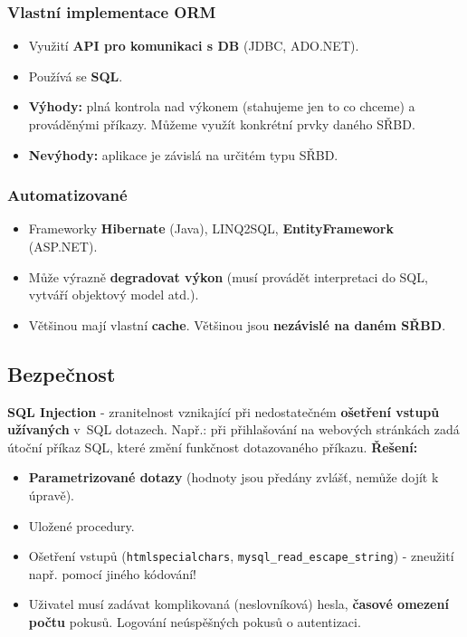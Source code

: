\subsubsection{Vlastní implementace ORM}
\begin{itemize}
\item Využití \textbf{API pro komunikaci s DB} (JDBC, ADO.NET).
\item Používá se \textbf{SQL}.
\item \textbf{Výhody:} plná kontrola nad výkonem (stahujeme jen to co chceme) a prováděnými příkazy. Můžeme využít konkrétní prvky daného SŘBD.
\item \textbf{Nevýhody:} aplikace je závislá na určitém typu SŘBD.
\end{itemize}

\subsubsection{Automatizované}
\begin{itemize}
\item Frameworky \textbf{Hibernate} (Java), LINQ2SQL, \textbf{EntityFramework} (ASP.NET).
\item Může výrazně \textbf{degradovat výkon} (musí provádět interpretaci do SQL, vytváří objektový model atd.).
\item Většinou mají vlastní \textbf{cache}. Většinou jsou \textbf{nezávislé na daném SŘBD}.
\end{itemize}

\subsection{Bezpečnost}
\textbf{SQL Injection} - zranitelnost vznikající při nedostatečném \textbf{ošetření vstupů užívaných} v SQL dotazech. Např.: při přihlašování na webových stránkách zadá útoční příkaz SQL, které změní funkčnost dotazovaného příkazu. \textbf{Řešení:}
\begin{itemize}
\item \textbf{Parametrizované dotazy} (hodnoty jsou předány zvlášť, nemůže dojít k úpravě).
\item Uložené procedury.
\item Ošetření vstupů (\texttt{htmlspecialchars}, \texttt{mysql\_read\_escape\_string}) - zneužití např. pomocí jiného kódování!
\item Uživatel musí zadávat komplikovaná (neslovníková) hesla, \textbf{časové omezení počtu} pokusů. Logování neúspěšných pokusů o autentizaci.
\end{itemize}
